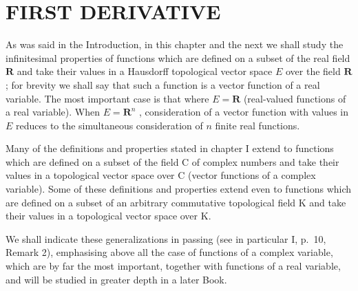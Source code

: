 \section{FIRST DERIVATIVE}

As was said in the Introduction, in this chapter and the next we shall study the infinitesimal properties of functions which are defined on a subset of the real field \(\mathbf{R}\) and take their values in a Hausdorff topological vector space \(E\) over the field \(\mathbf{R}\) ; for brevity we shall say that such a function is a vector function of a real variable. The most important case is that where \(E = \mathbf{R}\) (real-valued functions of a real variable). When \(E = \mathbf{R}^n\) , consideration of a vector function with values in \(E\) reduces to the simultaneous consideration of \(n\) finite real functions.

Many of the definitions and properties stated in chapter I extend to functions which are defined on a subset of the field C of complex numbers and take their values in a topological vector space over C (vector functions of a complex variable). Some of these definitions and properties extend even to functions which are defined on a subset of an arbitrary commutative topological field K and take their values in a topological vector space over K.

We shall indicate these generalizations in passing (see in particular I, p.~10, Remark 2), emphasising above all the case of functions of a complex variable, which are by far the most important, together with functions of a real variable, and will be studied in greater depth in a later Book.

